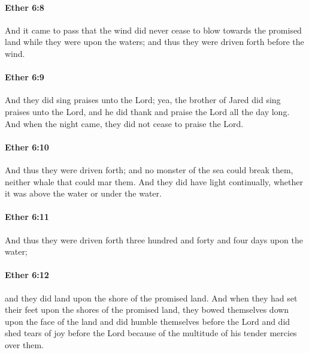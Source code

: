		\paragraph{Ether 6:8} %
			\label{ETHER-6-8}

			And it came to pass that the wind did never cease
			to blow towards the promised land while they were upon the waters;
			and thus they were driven forth before the wind.

		\paragraph{Ether 6:9} %
			\label{ETHER-6-9}

			And they did sing praises unto the Lord;
			yea, the brother of Jared did sing praises unto the Lord,
			and he did thank and praise the Lord all the day long.
			And when the night came, they did not cease to praise the Lord.

		\paragraph{Ether 6:10} %
			\label{ETHER-6-10}

			And thus they were driven forth;
			and no monster of the sea could break them,
			neither whale that could mar them.
			And they did have light continually,
			whether it was above the water or under the water.

		\paragraph{Ether 6:11} %
			\label{ETHER-6-11}

			And thus they were driven forth
			three hundred and forty and four days upon the water;

		\paragraph{Ether 6:12} %
			\label{ETHER-6-12}

			and they did land upon the shore of the promised land.
			And when they had set their feet upon the shores of the promised land,
			they bowed themselves down upon the face of the land
			and did humble themselves before the Lord
			and did shed tears of joy before the Lord
			because of the multitude of his tender mercies over them.

